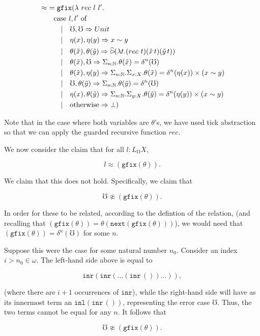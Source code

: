 \documentclass{article}
\newcommand{\later}{\vartriangleright\hspace{-2px}}
\newcommand{\nxt}{\texttt{next}}
\newcommand{\gfix}{\texttt{gfix}}
\newcommand{\laterhat}{\widehat{\later}}
\newcommand{\lift}{L_\mho}
\newcommand{\inl}{\texttt{inl}}
\newcommand{\inr}{\texttt{inr}}
\begin{document}
\begin{align*}
    &\approx \,\, = \gfix (\lambda \,\, rec \,\, l \,\, l'. \\
    &\quad\quad \text{case } l, l' \text{ of} \\
    &\quad\quad\quad | \quad \mho , \mho     \Rightarrow Unit \\
    &\quad\quad\quad | \quad \eta (x) , \eta (y) \Rightarrow x \sim y \\
    &\quad\quad\quad | \quad \theta (\tilde{x}) , \theta (\tilde{y}) \Rightarrow 
      \laterhat (\lambda t . (rec \,\, t) (\tilde{x} \, t) (\tilde{y} \, t)) \\
    &\quad\quad\quad | \quad \theta (\tilde{x}) , \mho    \Rightarrow 
      \Sigma_{n : \mathbb{N}} . \theta (\tilde{x}) = \delta^n (\mho) \\
    &\quad\quad\quad | \quad \theta (\tilde{x}) , \eta(y)  \Rightarrow 
      \Sigma_{n : \mathbb{N}} . \Sigma_{x : X} . 
        \theta (\tilde{x}) = \delta^n(\eta (x)) \times (x \sim y)\\
    &\quad\quad\quad | \quad \mho , \theta (\tilde{y}) \Rightarrow
      \Sigma_{n : \mathbb{N}} . \theta (\tilde{y}) = \delta^n (\mho) \\
    &\quad\quad\quad | \quad \eta (x) , \theta (\tilde{y}) \Rightarrow
      \Sigma_{n : \mathbb{N}} . \Sigma_{y : X} . 
        \theta (\tilde{y}) = \delta^n(\eta (y)) \times (x \sim y)\\
    &\quad\quad\quad | \quad \text{otherwise} \Rightarrow \bot
    )
\end{align*}

Note that in the case where both variables are $\theta$'s, we have
used tick abstraction so that we can apply the guarded recursive
function $rec$.

\vspace{4ex}

We now consider the claim that for all $l : \lift X$,

\[
    l \approx (\gfix (\theta)).
\]

We claim that this does not hold. Specifically, we claim that

\[
    \mho \not\approx (\gfix (\theta)).
\]

In order for these to be related, according to the defintion of the relation,
(and recalling that $(\gfix (\theta)) = \theta (\nxt (\gfix (\theta)))$),
we would need that $(\gfix (\theta)) = \delta^n (\mho)$ for some $n$.

Suppose this were the case for some natural number $n_0$.
Consider an index $i > n_0 \in \omega$. The left-hand side above is equal to

\[ \inr (\inr ( \dots ( \inr \, () ) \dots )), \]

(where there are $i+1$ occurrences of $\inr$), while the right-hand side will have
as its innermost term an $\inl (\inr \, ())$, representing the error case $\mho$.
Thus, the two terms cannot be equal for any $n$. It follows that 

\[
    \mho \not\approx (\gfix (\theta)).
\]
\end{document}
